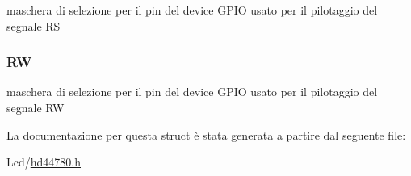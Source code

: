 maschera di selezione per il pin del device G\+P\+I\+O usato per il pilotaggio del segnale R\+S \hypertarget{struct_h_d44780___l_c_d__t_af404868fc36134454144950be4977d95}{
\subsubsection[{R\+W}]{ R\+W}}\label{struct_h_d44780___l_c_d__t_af404868fc36134454144950be4977d95}
maschera di selezione per il pin del device G\+P\+I\+O usato per il pilotaggio del segnale R\+W 

La documentazione per questa struct è stata generata a partire dal seguente file\+:\begin{DoxyCompactItemize}
\item 
Lcd/\hyperlink{hd44780_8h}{hd44780.\+h}\end{DoxyCompactItemize}

